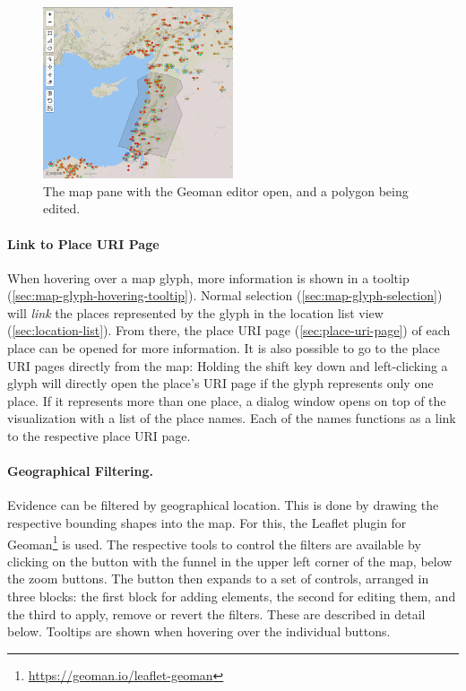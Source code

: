\begin{figure}[tb]
  \centering
  \includegraphics[width=0.5\textwidth]{../src/assets/visualization-documentation/map-3.png}
  \caption{
    The map pane with the Geoman editor open, and a polygon being edited.
  }
  \label{fig:map-3}
\end{figure}

\paragraph{Link to Place URI Page}
When hovering over a map glyph, more information is shown in a tooltip (\cref{sec:map-glyph-hovering-tooltip}).
Normal selection (\cref{sec:map-glyph-selection}) will \emph{link} the places represented by the glyph in the location list view (\cref{sec:location-list}).
From there, the place URI page (\cref{sec:place-uri-page}) of each place can be opened for more information.
It is also possible to go to the place URI pages directly from the map:
Holding the shift key down and left-clicking a glyph will directly open the place's URI page if the glyph represents only one place.
If it represents more than one place, a dialog window opens on top of the visualization with a list of the place names.
Each of the names functions as a link to the respective place URI page.

\paragraph{Geographical Filtering.}
Evidence can be filtered by geographical location.
This is done by drawing the respective bounding shapes into the map.
For this, the Leaflet plugin for Geoman\footnote{\url{https://geoman.io/leaflet-geoman}} is used.
The respective tools to control the filters are available by clicking on the button with the funnel in the upper left corner of the map, below the zoom buttons.
The button then expands to a set of controls, arranged in three blocks:
the first block for adding elements, the second for editing them, and the third to apply, remove or revert the filters.
These are described in detail below.
Tooltips are shown when hovering over the individual buttons.

